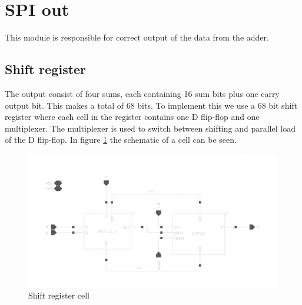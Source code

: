 \newpage
\section{SPI out}
This module is responsible for correct output of the data from the adder.




\subsection{Shift register}
The output consist of four sums, each containing 16 sum bits plus one carry output bit. This makes a total of 68 bits. To implement this we use a 68 bit shift register where each cell in the register contains one D flip-flop and one multiplexer. The multiplexer is used to switch between shifting and parallel load of the D flip-flop. In figure \ref{mux_dff} the schematic of a cell can be seen. 

\begin{figure}[H]
\centering
\captionsetup{justification=centering}
\includegraphics[scale=0.2]{../figures/mux_dffsr.png}
\caption{Shift register cell}
\label{mux_dff}
\end{figure}




